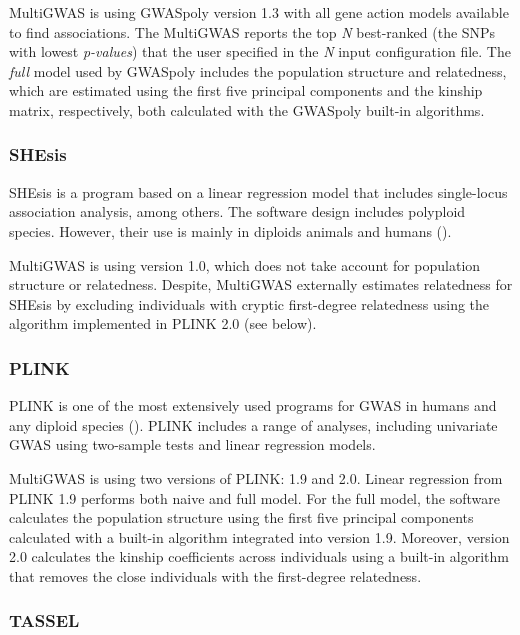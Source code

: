 \documentclass{article}
\begin{document}
MultiGWAS is using GWASpoly version 1.3 with all gene action models available to find associations. The MultiGWAS reports the top \emph{N} best-ranked (the SNPs with lowest \emph{p-values})  that the user specified in the \emph{N} input configuration file. The \emph{full }model used by GWASpoly includes the population structure and relatedness, which are estimated using the first five principal components and the kinship matrix, respectively, both calculated with the GWASpoly built-in algorithms.

\subsubsection{SHEsis}

SHEsis is a program based on a linear regression model that includes single-locus association analysis, among others. The software design includes polyploid species. However, their use is mainly in diploids animals and humans (\cite{Qiao2015, Meng2019}).

MultiGWAS is using version 1.0, which does not take account for population structure or relatedness. Despite, MultiGWAS externally estimates relatedness for SHEsis by excluding individuals with cryptic first-degree relatedness using the algorithm implemented in PLINK 2.0 (see below).

\subsubsection{PLINK}

PLINK is one of the most extensively used programs for GWAS in humans and any diploid species (\cite{Power2016}). PLINK includes a range of analyses, including univariate GWAS using two-sample tests and linear regression models.

MultiGWAS is using two versions of PLINK: 1.9 and 2.0. Linear regression from PLINK 1.9 performs both naive and full model. For the full model, the software calculates the population structure using the first five principal components calculated with a built-in algorithm integrated into version 1.9. Moreover, version 2.0 calculates the kinship coefficients across individuals using a built-in algorithm that removes the close individuals with the first-degree relatedness.

\subsubsection{TASSEL\label{subsec_TASSEL}}
\end{document}
